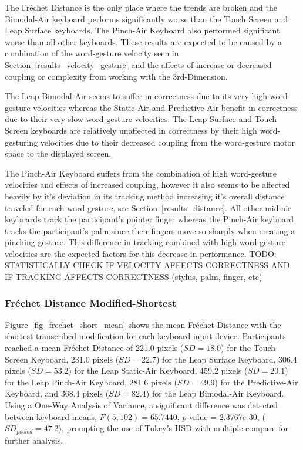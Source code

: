The Fr\'echet Distance is the only place where the trends are broken and the Bimodal-Air keyboard performs significantly worse than the Touch Screen and Leap Surface keyboards. The Pinch-Air Keyboard also performed significant worse than all other keyboards. These results are expected to be caused by a combination of the word-gesture velocity seen in Section~\ref{results_velocity_gesture} and the affects of increase or decreased coupling or complexity from working with the 3rd-Dimension.

The Leap Bimodal-Air seems to suffer in correctness due to its very high word-gesture velocities whereas the Static-Air and Predictive-Air benefit in correctness due to their very slow word-gesture velocities. The Leap Surface and Touch Screen keyboards are relatively unaffected in correctness by their high word-gesturing velocities due to their decreased coupling from the word-gesture motor space to the displayed screen. 

The Pinch-Air Keyboard suffers from the combination of high word-gesture velocities and effects of increased coupling, however it also seems to be affected heavily by it's deviation in its tracking method increasing it's overall distance traveled for each word-gesture, see Section~\ref{results_distance}. All other mid-air keyboards track the participant's pointer finger whereas the Pinch-Air keyboard tracks the participant's palm since their fingers move so sharply when creating a pinching gesture. This difference in tracking combined with high word-gesture velocities are the expected factors for this decrease in performance. TODO: STATISTICALLY CHECK IF VELOCITY AFFECTS CORRECTNESS AND IF TRACKING AFFECTS CORRECTNESS (stylus, palm, finger, etc)

\subsubsection{Fr\'echet Distance Modified-Shortest}
Figure~\ref{fig_frechet_short_mean} shows the mean Fr\'echet Distance with the shortest-transcribed modification for each keyboard input device. Participants reached a mean Fr\'echet Distance of 221.0 pixels ($SD = 18.0$) for the Touch Screen Keyboard, 231.0 pixels ($SD = 22.7$) for the Leap Surface Keyboard, 306.4 pixels ($SD = 53.2$) for the Leap Static-Air Keyboard, 459.2 pixels ($SD = 20.1$) for the Leap Pinch-Air Keyboard, 281.6 pixels ($SD = 49.9$) for the Predictive-Air Keyboard, and 368.4 pixels ($SD = 82.4$) for the Leap Bimodal-Air Keyboard. Using a One-Way Analysis of Variance, a significant difference was detected between keyboard means, $F(5, 102) = 65.7440$, $p$-value = 2.3767$e$-30, ($SD_{pooled} = 47.2$), prompting the use of Tukey's HSD with multiple-compare for further analysis.

